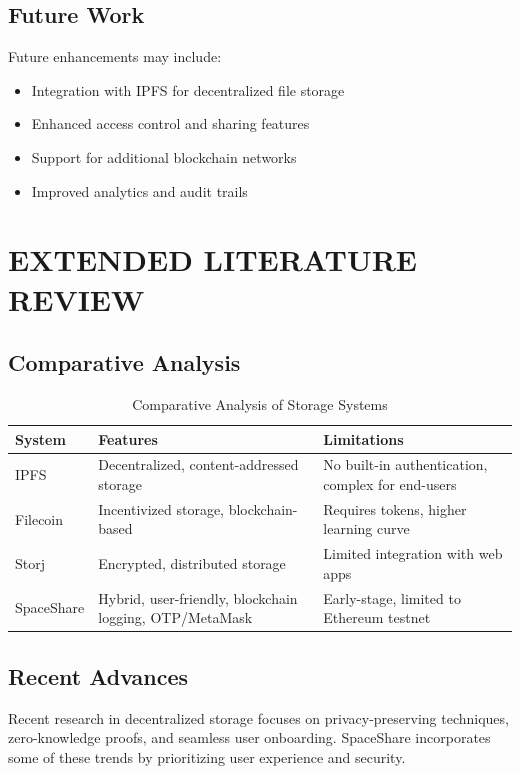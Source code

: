 \documentclass[a4paper, 12pt]{report}
\newenvironment{frontmatter}{}{}
\begin{document}
\begin{frontmatter}
\section{Future Work}
Future enhancements may include:
\begin{itemize}
  \item Integration with IPFS for decentralized file storage
  \item Enhanced access control and sharing features
  \item Support for additional blockchain networks
  \item Improved analytics and audit trails
\end{itemize}

\chapter{EXTENDED LITERATURE REVIEW}
\section{Comparative Analysis}
\begin{longtable}{|p{}|p{}|p{}|}
\caption{Comparative Analysis of Storage Systems} \\
\hline
\textbf{System} & \textbf{Features} & \textbf{Limitations} \\
\hline
IPFS & Decentralized, content-addressed storage & No built-in authentication, complex for end-users \\
\hline
Filecoin & Incentivized storage, blockchain-based & Requires tokens, higher learning curve \\
\hline
Storj & Encrypted, distributed storage & Limited integration with web apps \\
\hline
SpaceShare & Hybrid, user-friendly, blockchain logging, OTP/MetaMask & Early-stage, limited to Ethereum testnet \\
\hline
\end{longtable}

\section{Recent Advances}
Recent research in decentralized storage focuses on privacy-preserving techniques, zero-knowledge proofs, and seamless user onboarding. SpaceShare incorporates some of these trends by prioritizing user experience and security.


\end{frontmatter}
\end{document}
